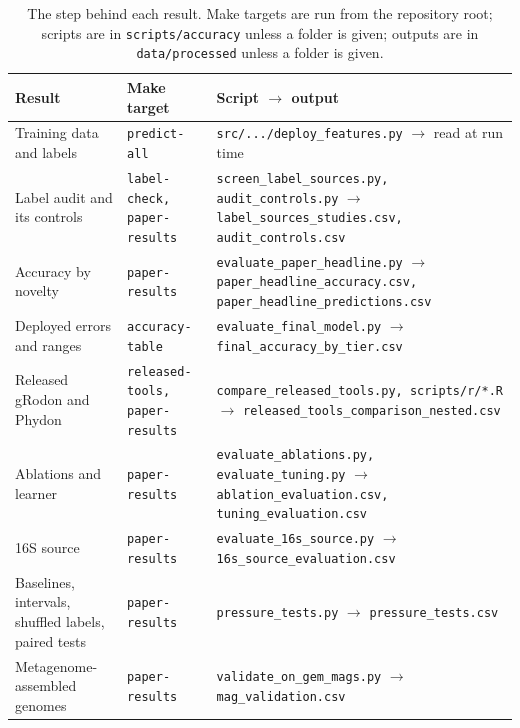 \begin{table}[ht]\centering\footnotesize
\caption{The step behind each result. Make targets are run from the repository root; scripts are in
\texttt{scripts/accuracy} unless a folder is given; outputs are in \texttt{data/processed} unless a folder is given.}\label{tab:reproduce}
\begin{tabular}{>{\raggedright}p{3.4cm}>{\raggedright}p{2.7cm}>{\raggedright\arraybackslash}p{9.6cm}}
\toprule
Result & Make target & Script $\to$ output \\
\midrule
Training data and labels & \texttt{predict-all} & \texttt{src/.../deploy\_features.py} \newline $\to$ read at run time \\
Label audit and its controls & \texttt{label-check, paper-results} & \texttt{screen\_label\_sources.py, audit\_controls.py} \newline $\to$ \texttt{label\_sources\_studies.csv, audit\_controls.csv} \\
Accuracy by novelty & \texttt{paper-results} & \texttt{evaluate\_paper\_headline.py} \newline $\to$ \texttt{paper\_headline\_accuracy.csv, paper\_headline\_predictions.csv} \\
Deployed errors and ranges & \texttt{accuracy-table} & \texttt{evaluate\_final\_model.py} \newline $\to$ \texttt{final\_accuracy\_by\_tier.csv} \\
Released gRodon and Phydon & \texttt{released-tools, paper-results} & \texttt{compare\_released\_tools.py, scripts/r/*.R} \newline $\to$ \texttt{released\_tools\_comparison\_nested.csv} \\
Ablations and learner & \texttt{paper-results} & \texttt{evaluate\_ablations.py, evaluate\_tuning.py} \newline $\to$ \texttt{ablation\_evaluation.csv, tuning\_evaluation.csv} \\
16S source & \texttt{paper-results} & \texttt{evaluate\_16s\_source.py} \newline $\to$ \texttt{16s\_source\_evaluation.csv} \\
Baselines, intervals, shuffled labels, paired tests & \texttt{paper-results} & \texttt{pressure\_tests.py} \newline $\to$ \texttt{pressure\_tests.csv} \\
Metagenome-assembled genomes & \texttt{paper-results} & \texttt{validate\_on\_gem\_mags.py} \newline $\to$ \texttt{mag\_validation.csv} \\

\end{tabular}
\end{table}
